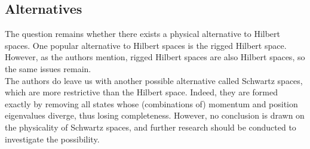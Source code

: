 \documentclass[12pt]{article}
\begin{document}
\begin{multicols}{2}
    \section*{Alternatives}
    The question remains whether there exists a physical alternative to Hilbert spaces. One popular alternative to Hilbert spaces is the rigged Hilbert space\cite{de_la_madrid_role_2005}. However, as the authors mention, rigged Hilbert spaces are also Hilbert spaces, so the same issues remain.\\
    The authors do leave us with another possible alternative called Schwartz spaces, which are more restrictive than the Hilbert space. Indeed, they are formed exactly by removing all states whose (combinations of) momentum and position eigenvalues diverge, thus losing completeness. However, no conclusion is drawn on the physicality of Schwartz spaces, and further research should be conducted to investigate the possibility.
\end{multicols}
\printbibliography
\end{document}
